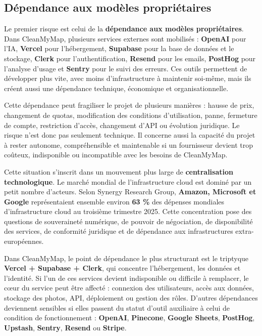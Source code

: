 \documentclass[
  10pt,
  a4paper,
  DIV=11,
  numbers=noendperiod,
  oneside]{scrreprt}
\let\oldtextbf\textbf
\renewcommand{\textbf}[1]{\oldtextbf{\textcolor{cmmnavy}{#1}}}
\begin{document}
\subsection{Dépendance aux modèles
propriétaires}\label{duxe9pendance-aux-moduxe8les-propriuxe9taires}

Le premier risque est celui de la \textbf{dépendance aux modèles
propriétaires}. Dans CleanMyMap, plusieurs services externes sont
mobilisés : \textbf{OpenAI} pour l'IA, \textbf{Vercel} pour
l'hébergement, \textbf{Supabase} pour la base de données et le stockage,
\textbf{Clerk} pour l'authentification, \textbf{Resend} pour les emails,
\textbf{PostHog} pour l'analyse d'usage et \textbf{Sentry} pour le suivi
des erreurs. Ces outils permettent de développer plus vite, avec moins
d'infrastructure à maintenir soi-même, mais ils créent aussi une
dépendance technique, économique et organisationnelle.

Cette dépendance peut fragiliser le projet de plusieurs manières :
hausse de prix, changement de quotas, modification des conditions
d'utilisation, panne, fermeture de compte, restriction d'accès,
changement d'API ou évolution juridique. Le risque n'est donc pas
seulement technique. Il concerne aussi la capacité du projet à rester
autonome, compréhensible et maintenable si un fournisseur devient trop
coûteux, indisponible ou incompatible avec les besoins de CleanMyMap.

Cette situation s'inscrit dans un mouvement plus large de
\textbf{centralisation technologique}. Le marché mondial de
l'infrastructure cloud est dominé par un petit nombre d'acteurs. Selon
Synergy Research Group, \textbf{Amazon, Microsoft et Google}
représentaient ensemble environ \textbf{63 \%} des dépenses mondiales
d'infrastructure cloud au troisième trimestre 2025. Cette concentration
pose des questions de souveraineté numérique, de pouvoir de négociation,
de disponibilité des services, de conformité juridique et de dépendance
aux infrastructures extra-européennes.

Dans CleanMyMap, le point de dépendance le plus structurant est le
triptyque \textbf{Vercel + Supabase + Clerk}, qui concentre
l'hébergement, les données et l'identité. Si l'un de ces services
devient indisponible ou difficile à remplacer, le cœur du service peut
être affecté : connexion des utilisateurs, accès aux données, stockage
des photos, API, déploiement ou gestion des rôles. D'autres dépendances
deviennent sensibles si elles passent du statut d'outil auxiliaire à
celui de condition de fonctionnement : \textbf{OpenAI},
\textbf{Pinecone}, \textbf{Google Sheets}, \textbf{PostHog},
\textbf{Upstash}, \textbf{Sentry}, \textbf{Resend} ou \textbf{Stripe}.
\end{document}
